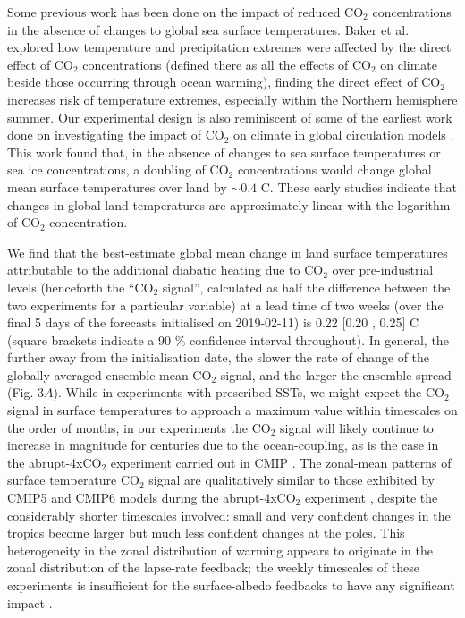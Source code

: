   Some previous work has been done on the impact of reduced CO$_2$ concentrations in the absence of changes to global sea surface temperatures. Baker et al. \citep{baker_higher_2018} explored how temperature and precipitation extremes were affected by the direct effect of CO$_2$ concentrations (defined there as all the effects of CO$_2$ on climate beside those occurring through ocean warming), finding the direct effect of CO$_2$ increases risk of temperature extremes, especially within the Northern hemisphere summer. Our experimental design is also reminiscent of some of the earliest work done on investigating the impact of CO$_2$ on climate in global circulation models \citep{gates_preliminary_1981,mitchell_seasonal_1983}. This work found that, in the absence of changes to sea surface temperatures or sea ice concentrations, a doubling of CO$_2$ concentrations would change global mean surface temperatures over land by $\sim0.4$ \degree C. These early studies indicate that changes in global land temperatures are approximately linear with the logarithm of CO$_2$ concentration.
  
  We find that the best-estimate global mean change in land surface temperatures attributable to the additional diabatic heating due to CO$_2$ over pre-industrial levels (henceforth the ``CO$_2$ signal'', calculated as half the difference between the two experiments for a particular variable) at a lead time of two weeks (over the final 5 days of the forecasts initialised on 2019-02-11) is 0.22 [0.20 , 0.25] \degree C (square brackets indicate a 90 \% confidence interval throughout). In general, the further away from the initialisation date, the slower the rate of change of the globally-averaged ensemble mean CO$_2$ signal, and the larger the ensemble spread (Fig. $3A$). While in experiments with prescribed SSTs, we might expect the CO$_2$ signal in surface temperatures to approach a maximum value within timescales on the order of months, in our experiments the CO$_2$ signal will likely continue to increase in magnitude for centuries due to the ocean-coupling, as is the case in the abrupt-4xCO$_2$ experiment carried out in CMIP \citep{taylor_overview_2012,eyring_overview_2016,rugenstein_equilibrium_2020}. The zonal-mean patterns of surface temperature CO$_2$ signal are qualitatively similar to those exhibited by CMIP5 and CMIP6 models during the abrupt-4xCO$_2$ experiment \citep{flynn_climate_2020,andrews_dependence_2015}, despite the considerably shorter timescales involved: small and very confident changes in the tropics become larger but much less confident changes at the poles. This heterogeneity in the zonal distribution of warming appears to originate in the zonal distribution of the lapse-rate feedback; the weekly timescales of these experiments is insufficient for the surface-albedo feedbacks to have any significant impact \citep{smith_polar_2019}.
  

